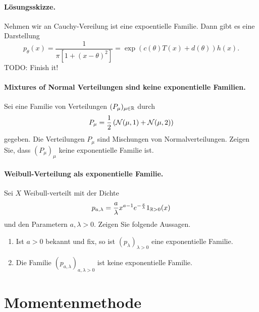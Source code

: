 \paragraph*{Lösungsskizze.} Nehmen wir an Cauchy-Vereilung ist eine expoentielle Familie. Dann 
gibt es eine Darstellung 
\begin{equation}
    p_\theta(x) = \frac{1}{\pi\left[ 1 + \left( x - \theta \right)^2 \right]} =
    \exp\left( c(\theta) T(x) + d(\theta) \right)h(x).
\end{equation}
TODO: Finish it! 

\paragraph{Mixtures of Normal Verteilungen sind keine exponentielle Familien.}
Sei eine Familie von Verteilungen $(P_\mu)_{\mu\in\mathbb R}$ durch 
\begin{equation*}
    P_\mu = \frac{1}{2} \left( \mathcal N(\mu,1) +  \mathcal N(\mu,2) \right) 
\end{equation*}
gegeben. Die Verteilungen $P_\mu$ sind Mischungen von Normalverteilungen.
Zeigen Sie, dass $(P_\mu)_{\mu}$ keine exponentielle Familie ist.


\paragraph{Weibull-Verteilung als exponentielle Familie.} 
Sei $X$ Weibull-verteilt mit der Dichte
\begin{equation*}
    p_{a,\lambda} = \frac{a}{\lambda} x^{a-1} e^{-\frac{x}{\lambda}} 1_{\mathbb R>0}(x)  
\end{equation*}
und den Parametern $a,\lambda>0$. Zeigen Sie folgende Aussagen.
\begin{enumerate}
    \item Ist $a>0$ bekannt und fix, so ist $(p_\lambda)_{\lambda>0}$ eine
        exponentielle Familie.
    \item Die Familie $(p_{a,\lambda})_{a,\lambda>0}$ ist keine exponentielle Familie. 
\end{enumerate} 


\section{Momentenmethode}


